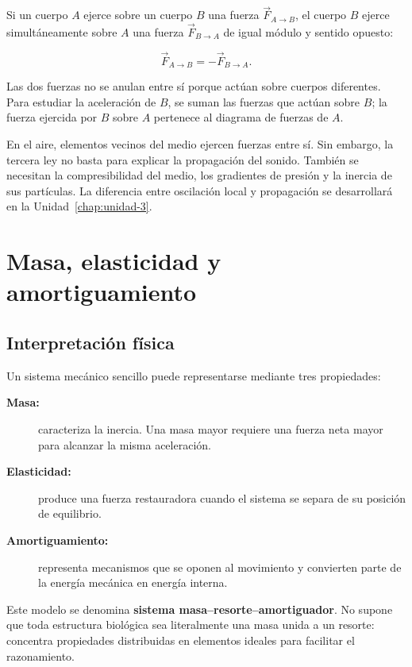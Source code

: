 Si un cuerpo \(A\) ejerce sobre un cuerpo \(B\) una fuerza \(\vec F_{A\rightarrow B}\), el cuerpo \(B\) ejerce simultáneamente sobre \(A\) una fuerza \(\vec F_{B\rightarrow A}\) de igual módulo y sentido opuesto:

\begin{equation}
    \vec F_{A\rightarrow B}=-\vec F_{B\rightarrow A}.
    \label{eq:u2-tercera-ley}
\end{equation}

Las dos fuerzas no se anulan entre sí porque actúan sobre cuerpos diferentes. Para estudiar la aceleración de \(B\), se suman las fuerzas que actúan sobre \(B\); la fuerza ejercida por \(B\) sobre \(A\) pertenece al diagrama de fuerzas de \(A\).

En el aire, elementos vecinos del medio ejercen fuerzas entre sí. Sin embargo, la tercera ley no basta para explicar la propagación del sonido. También se necesitan la compresibilidad del medio, los gradientes de presión y la inercia de sus partículas. La diferencia entre oscilación local y propagación se desarrollará en la Unidad~\ref{chap:unidad-3}.

\section{Masa, elasticidad y amortiguamiento}
\label{sec:u2-masa-resorte-amortiguador}

\subsection{Interpretación física}
\label{sec:u2-msa-interpretacion}

Un sistema mecánico sencillo puede representarse mediante tres propiedades:

\begin{description}
    \item[\textbf{Masa:}] caracteriza la inercia. Una masa mayor requiere una fuerza neta mayor para alcanzar la misma aceleración.
    \item[\textbf{Elasticidad:}] produce una fuerza restauradora cuando el sistema se separa de su posición de equilibrio.
    \item[\textbf{Amortiguamiento:}] representa mecanismos que se oponen al movimiento y convierten parte de la energía mecánica en energía interna.
\end{description}

Este modelo se denomina \textbf{sistema masa--resorte--amortiguador}. No supone que toda estructura biológica sea literalmente una masa unida a un resorte: concentra propiedades distribuidas en elementos ideales para facilitar el razonamiento.

